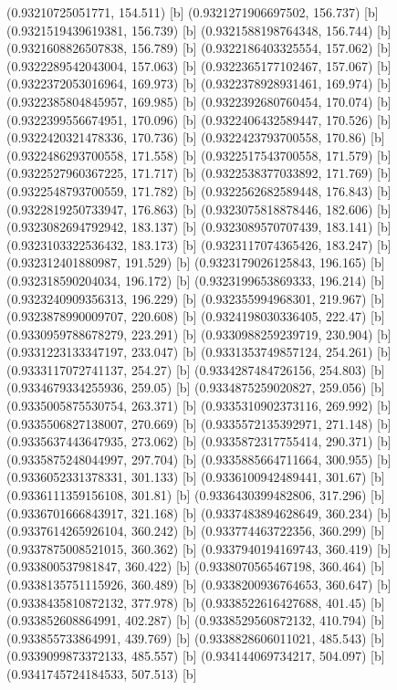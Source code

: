 {{{(0.93210725051771, 154.511) [b] 
(0.9321271906697502, 156.737) [b] 
(0.9321519439619381, 156.739) [b] 
(0.9321588198764348, 156.744) [b] 
(0.9321608826507838, 156.789) [b] 
(0.9322186403325554, 157.062) [b] 
(0.9322289542043004, 157.063) [b] 
(0.9322365177102467, 157.067) [b] 
(0.9322372053016964, 169.973) [b] 
(0.9322378928931461, 169.974) [b] 
(0.9322385804845957, 169.985) [b] 
(0.9322392680760454, 170.074) [b] 
(0.9322399556674951, 170.096) [b] 
(0.9322406432589447, 170.526) [b] 
(0.9322420321478336, 170.736) [b] 
(0.9322423793700558, 170.86) [b] 
(0.9322486293700558, 171.558) [b] 
(0.9322517543700558, 171.579) [b] 
(0.9322527960367225, 171.717) [b] 
(0.9322538377033892, 171.769) [b] 
(0.9322548793700559, 171.782) [b] 
(0.9322562682589448, 176.843) [b] 
(0.9322819250733947, 176.863) [b] 
(0.9323075818878446, 182.606) [b] 
(0.9323082694792942, 183.137) [b] 
(0.9323089570707439, 183.141) [b] 
(0.9323103322536432, 183.173) [b] 
(0.9323117074365426, 183.247) [b] 
(0.932312401880987, 191.529) [b] 
(0.9323179026125843, 196.165) [b] 
(0.932318590204034, 196.172) [b] 
(0.9323199653869333, 196.214) [b] 
(0.9323240909356313, 196.229) [b] 
(0.932355994968301, 219.967) [b] 
(0.9323878990009707, 220.608) [b] 
(0.9324198030336405, 222.47) [b] 
(0.9330959788678279, 223.291) [b] 
(0.9330988259239719, 230.904) [b] 
(0.9331223133347197, 233.047) [b] 
(0.9331353749857124, 254.261) [b] 
(0.9333117072741137, 254.27) [b] 
(0.9334287484726156, 254.803) [b] 
(0.9334679334255936, 259.05) [b] 
(0.9334875259020827, 259.056) [b] 
(0.9335005875530754, 263.371) [b] 
(0.9335310902373116, 269.992) [b] 
(0.9335506827138007, 270.669) [b] 
(0.9335572135392971, 271.148) [b] 
(0.9335637443647935, 273.062) [b] 
(0.9335872317755414, 290.371) [b] 
(0.9335875248044997, 297.704) [b] 
(0.9335885664711664, 300.955) [b] 
(0.9336052331378331, 301.133) [b] 
(0.9336100942489441, 301.67) [b] 
(0.9336111359156108, 301.81) [b] 
(0.9336430399482806, 317.296) [b] 
(0.9336701666843917, 321.168) [b] 
(0.9337483894628649, 360.234) [b] 
(0.9337614265926104, 360.242) [b] 
(0.933774463722356, 360.299) [b] 
(0.9337875008521015, 360.362) [b] 
(0.9337940194169743, 360.419) [b] 
(0.933800537981847, 360.422) [b] 
(0.9338070565467198, 360.464) [b] 
(0.9338135751115926, 360.489) [b] 
(0.9338200936764653, 360.647) [b] 
(0.9338435810872132, 377.978) [b] 
(0.9338522616427688, 401.45) [b] 
(0.933852608864991, 402.287) [b] 
(0.9338529560872132, 410.794) [b] 
(0.933855733864991, 439.769) [b] 
(0.9338828606011021, 485.543) [b] 
(0.9339099873372133, 485.557) [b] 
(0.934144069734217, 504.097) [b] 
(0.9341745724184533, 507.513) [b] 
}}}
